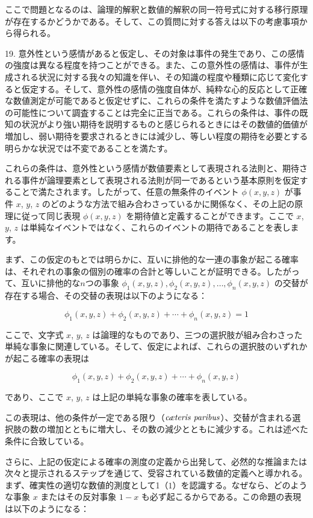 \documentclass[a4paper,11pt,openany]{ltjsbook}
\begin{document}
ここで問題となるのは、論理的解釈と数値的解釈の同一符号式に対する移行原理が存在するかどうかである。そして、この質問に対する答えは以下の考慮事項から得られる。

19. 意外性という感情があると仮定し、その対象は事件の発生であり、この感情の強度は異なる程度を持つことができる。また、この意外性の感情は、事件が生成される状況に対する我々の知識を伴い、その知識の程度や種類に応じて変化すると仮定する。そして、意外性の感情の強度自体が、純粋な心的反応として正確な数値測定が可能であると仮定せずに、これらの条件を満たすような数値評価法の可能性について調査することは完全に正当である。これらの条件は、事件の既知の状況がより強い期待を説明するものと感じられるときにはその数値的価値が増加し、弱い期待を要求されるときには減少し、等しい程度の期待を必要とする明らかな状況では不変であることを満たす。

これらの条件は、意外性という感情が数値要素として表現される法則と、期待される事件が論理要素として表現される法則が同一であるという基本原則を仮定することで満たされます。したがって、任意の無条件のイベント $\phi(x, y, z)$ が事件 $x$, $y$, $z$ のどのような方法で組み合わさっているかに関係なく、その上記の原理に従って同じ表現 $\phi(x, y, z)$ を期待値と定義することができます。ここで $x$, $y$, $z$ は単純なイベントではなく、これらのイベントの期待であることを表します。

まず、この仮定のもとでは明らかに、互いに排他的な一連の事象が起こる確率は、それぞれの事象の個別の確率の合計と等しいことが証明できる。したがって、互いに排他的な$n$つの事象 $\phi_1(x, y, z), \phi_2(x, y, z), \dotsc, \phi_n(x, y, z)$ の交替が存在する場合、その交替の表現は以下のようになる：

\[
  \phi_1(x, y, z) + \phi_2(x, y, z) + \dotsb + \phi_n(x, y, z) = 1
\]

ここで、文字式 $x$, $y$, $z$ は論理的なものであり、三つの選択肢が組み合わさった単純な事象に関連している。そして、仮定によれば、これらの選択肢のいずれかが起こる確率の表現は

\[
  \phi_1(x, y, z) + \phi_2(x, y, z) + \dotsb + \phi_n(x, y, z)
\]

であり、ここで $x$, $y$, $z$ は上記の単純な事象の確率を表している。

この表現は、他の条件が一定である限り（$\emph{c\ae teris paribus}$）、交替が含まれる選択肢の数の増加とともに増大し、その数の減少とともに減少する。これは述べた条件に合致している。

さらに、上記の仮定による確率の測度の定義から出発して、必然的な推論または次々と提示されるステップを通じて、受容されている数値的定義へと導かれる。まず、確実性の適切な数値的測度として1（$1$）を認識する。なぜなら、どのような事象 $x$ またはその反対事象 $1-x$ も必ず起こるからである。この命題の表現は以下のようになる：
\end{document}

